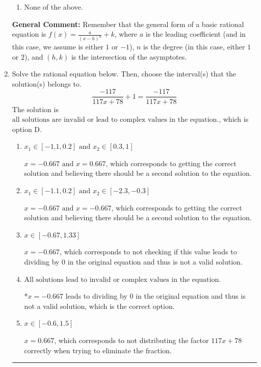 \documentclass{extbook}[14pt]
\newcommand{\litem}[1]{\item #1

\rule{\textwidth}{0.4pt}}
\begin{document}
\begin{enumerate}
{\begin{enumerate}[label=\Alph*.]
\begin{multicols}{2}
\end{multicols}\item None of the above.\end{enumerate}
\textbf{General Comment:} Remember that the general form of a basic rational equation is $ f(x) = \frac{a}{(x-h)^n} + k$, where $a$ is the leading coefficient (and in this case, we assume is either $1$ or $-1$), $n$ is the degree (in this case, either $1$ or $2$), and $(h, k)$ is the intersection of the asymptotes.
}
\litem{
Solve the rational equation below. Then, choose the interval(s) that the solution(s) belongs to.
\[ \frac{-117}{117x + 78} + 1 = \frac{-117}{117x + 78} \]The solution is \( \text{all solutions are invalid or lead to complex values in the equation.} \), which is option D.\begin{enumerate}[label=\Alph*.]
\item \( x_1 \in [-1.1, 0.2] \text{ and } x_2 \in [0.3,1] \)

$x = -0.667 \text{ and } x = 0.667$, which corresponds to getting the correct solution and believing there should be a second solution to the equation.
\item \( x_1 \in [-1.1, 0.2] \text{ and } x_2 \in [-2.3,-0.3] \)

$x = -0.667 \text{ and } x = -0.667$, which corresponds to getting the correct solution and believing there should be a second solution to the equation.
\item \( x \in [-0.67,1.33] \)

$x = -0.667$, which corresponds to not checking if this value leads to dividing by 0 in the original equation and thus is not a valid solution.
\item \( \text{All solutions lead to invalid or complex values in the equation.} \)

*$x = -0.667$ leads to dividing by 0 in the original equation and thus is not a valid solution, which is the correct option.
\item \( x \in [-0.6,1.5] \)

$x = 0.667$, which corresponds to not distributing the factor $117x + 78$ correctly when trying to eliminate the fraction.
\end{enumerate}

}
\end{enumerate}
\end{document}
